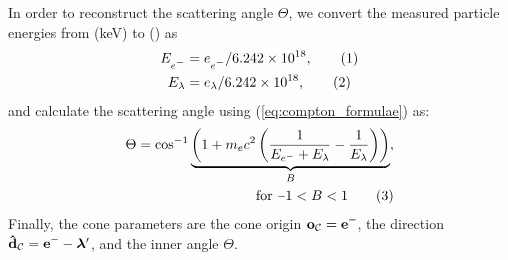\documentclass[a4paper,11pt,titlepage,twoside]{book}
\newcommand\numberthis{\addtocounter{equation}{1}\tag{\theequation}}
\newcommand{\minus}{\scalebox{0.75}[1.0]{$-$}}
\begin{document}
In order to reconstruct the scattering angle $\Theta$, we convert the measured particle energies from (\si{\kilo\electronvolt}) to (\si{\joul}) as
\begin{align*}
  E_{e^{\minus}} &= e_{e^{\minus}}/6.242\times10^{18},\numberthis\\
  E_{\lambda} &= e_{\lambda}/6.242\times10^{18},\numberthis
\end{align*}
and calculate the scattering angle using (\ref{eq:compton_formulae}) as:
\begin{align*}
  \Theta = \cos^{-1} \underbrace{\left(1 + m_e c^2 \left(\frac{1}{E_{e^{-}} + E_\lambda} - \frac{1}{E_\lambda}\right)\right)}_{B},\\\text{for}\ \minus 1 < B < 1\numberthis
  \label{eq:theta_equation}
\end{align*}
Finally, the cone parameters are the cone origin $\mathbf{o}_{\mathcal{C}} = \mathbf{e}^{\minus}$, the direction $\mathbf{\hat{d}}_\mathcal{C} = \mathbf{e}^{\minus} - \bm{\lambda}'$, and the inner angle $\Theta$.

\end{document}
